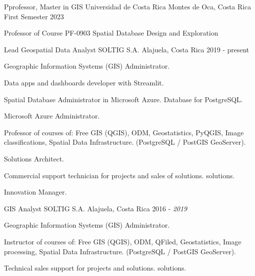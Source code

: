 

\begin{cventries}

  \cventry
    {Pprofessor, Master in GIS} %
    {Universidad de Costa Rica} %
    {Montes de Oca, Costa Rica} %
    {First Semester 2023} %
    {
      \begin{cvitems} %
        \item Professor of Course PF-0903 Spatial Database Design and Exploration
      \end{cvitems}
    }
  \cventry
    {Lead Geospatial Data Analyst} %
    {SOLTIG S.A.} %
    {Alajuela, Costa Rica} %
    {2019 - present} %
    {
      \begin{cvitems} %
        \item Geographic Information Systems (GIS) Administrator.
        \item Data apps and dashboards developer with Streamlit.
        \item Spatial Database Administrator in Microsoft Azure.
        Database for PostgreSQL.
        \item Microsoft Azure Administrator.
        \item Professor of courses of: Free GIS (QGIS), ODM, Geostatistics, PyQGIS,
        Image classifications, Spatial Data Infrastructure.
        (PostgreSQL / PostGIS GeoServer).
        \item Solutions Architect.
        \item Commercial support technician for projects and sales of solutions.
        solutions.
        \item Innovation Manager.
      \end{cvitems}
    }
  \cventry
    {GIS Analyst} %
    {SOLTIG S.A.} %
    {Alajuela, Costa Rica} %
    {2016 - \textit{2019}} %
    {
      \begin{cvitems} %
        \item Geographic Information Systems (GIS) Administrator.
        \item Instructor of courses of: Free GIS (QGIS), ODM, QFiled, Geostatistics,
        Image processing, Spatial Data Infrastructure.
        (PostgreSQL / PostGIS GeoServer).
        \item Technical sales support for projects and solutions.
        solutions.
      \end{cvitems}
    }
\end{cventries}
\newpage